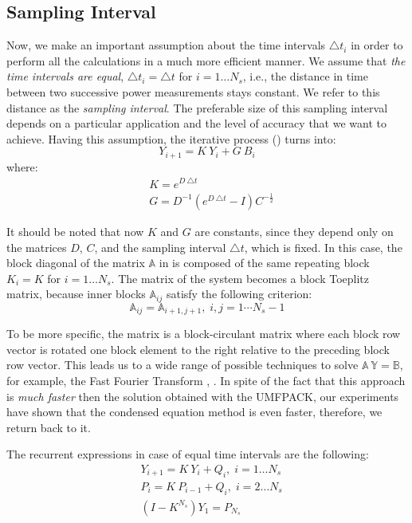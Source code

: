 \subsection{Sampling Interval}
Now, we make an important assumption about the time intervals $\triangle t_i$ in order to perform all the calculations in a much more efficient manner. We assume that \emph{the time intervals are equal}, $\triangle t_i = \triangle t$ for $i = 1 \dots N_s$, i.e., the distance in time between two successive power measurements stays constant. We refer to this distance as the \emph{sampling interval}. The preferable size of this sampling interval depends on a particular application and the level of accuracy that we want to achieve. Having this assumption, the iterative process () turns into:
\[
  Y_{i+1} = K \: Y_i + G \: B_i
\]
where:
\begin{align*}
  & K = e^{D \: \triangle t} \\
  & G = D^{-1} \left( e^{D \: \triangle t} - I \right) C^{-\frac{1}{2}}
\end{align*}

It should be noted that now $K$ and $G$ are constants, since they depend only on the matrices $D$, $C$, and the sampling interval $\triangle t$, which is fixed. In this case, the block diagonal of the matrix $\mathbb{A}$ in  is composed of the same repeating block $K_i = K$ for $i = 1 \dots N_s$. The matrix of the system becomes a block Toeplitz matrix, because inner blocks $\mathbb{A}_{ij}$ satisfy the following criterion:
\[
  \mathbb{A}_{ij} = \mathbb{A}_{i+1, j+1}, \; i, j = 1 \cdots N_s - 1
\]

To be more specific, the matrix is a block-circulant matrix where each block row vector is rotated one block element to the right relative to the preceding block row vector. This leads us to a wide range of possible techniques to solve \mbox{$\mathbb{A} \: \mathbb{Y} = \mathbb{B}$}, for example, the Fast Fourier Transform \cite{mazancourt1983}, \cite{vescovo1997}. In spite of the fact that this approach is \emph{much faster} then the solution obtained with the UMFPACK, our experiments have shown that the condensed equation method is even faster, therefore, we return back to it.

The recurrent expressions in case of equal time intervals are the following:
\begin{align}
  & Y_{i + 1} = K \: Y_i + Q_i, \; i = 1 \dots N_s \nonumber \\
  & P_i = K \: P_{i - 1} + Q_i, \; i = 2 \dots N_s \nonumber \\
  & (I - K^{N_s}) Y_1 = P_{N_s} \label{eq:linear-system}
\end{align}

